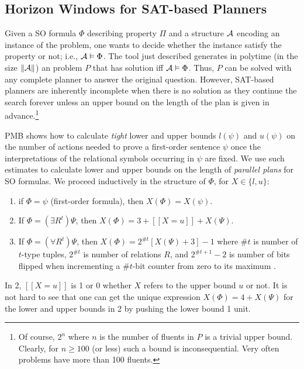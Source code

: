 \subsection{Horizon Windows for SAT-based Planners}

Given a SO formula $\Phi$ describing property $\Pi$ and a
structure $\mathcal{A}$ encoding an instance of the problem, one
wants to decide whether the instance satisfy the property
or not; i.e., $\mathcal{A}\vDash\Phi$. The tool just described 
generates in polytime (in the size $\|\mathcal{A}\|$) an \STRIPS
problem $P$ that has solution iff $\mathcal{A}\vDash\Phi$.
Thus, $P$ can be solved with any complete planner to
answer the original question. However, SAT-based planners
are inherently incomplete when there is no solution as
they continue the search forever unless an upper bound
on the length of the plan is given in advance.\footnote{Of
course, $2^n$ where $n$ is the number of fluents in $P$
is a trivial upper bound. Clearly, for $n\geq100$ (or less)
such a bound is inconsequential. Very often problems have
more than 100 fluents.}

PMB shows how to calculate \emph{tight} lower and upper bounds
$l(\psi)$ and $u(\psi)$ on the number of actions needed to prove
a first-order sentence $\psi$ once the interpretations of the
relational symbols occurring in $\psi$ are fixed.
We use such estimates to calculate lower and upper bounds on
the length of \emph{parallel plans} for SO formulas.
We proceed inductively
in the structure of $\Phi$, for $X\in\{l,u\}$:
\begin{enumerate}[1.]
\item if $\Phi=\psi$ (first-order formula), then $X(\Phi)=X(\psi)$.
\item If $\Phi=(\exists R^t)\Psi$, then $X(\Phi)=3+[\![X=u]\!]+X(\Psi)$.
\item If $\Phi=(\forall R^t)\Psi$, then
  $X(\Phi)=2^{\#t}[X(\Psi)+3]-1$%
where
  $\#t$ is number of $t$-type tuples, $2^{\#t}$
  is number of relations $R$, and $2^{\#t+1}-2$ is number
  of bits flipped when incrementing a $\#t$-bit counter
  from zero to its maximum \cite{cormen:algorithms}.
\end{enumerate}
In 2, $[\![X=u]\!]$ is 1 or 0 whether $X$ refers to the 
upper bound $u$ or not. It is not hard to see that one
can get the unique expression $X(\Phi)=4+X(\Psi)$ for the
lower and upper bounds in 2 by pushing the lower bound 1 unit.
